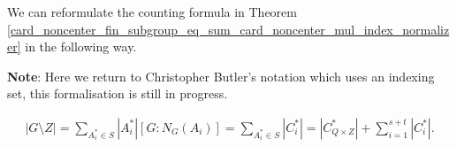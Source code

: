 





We can reformulate the counting formula in Theorem \ref{card_noncenter_fin_subgroup_eq_sum_card_noncenter_mul_index_normalizer} in the following way.

\textbf{Note}: Here we return to Christopher Butler's notation which uses an indexing set, this formalisation is still in progress.


\begin{align*} |G \! \setminus \! Z| = \sum_{A_i^* \in S} |A_i^*| [G:N_G(A_i)] = \sum_{A_i^* \in S} |C_i^*| = |C_{Q \times Z}^*| + \sum_{i=1}^{s+t} |C_i^*|.
\end{align*}

